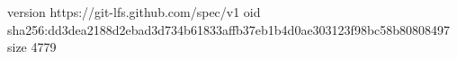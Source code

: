 version https://git-lfs.github.com/spec/v1
oid sha256:dd3dea2188d2ebad3d734b61833affb37eb1b4d0ae303123f98bc58b80808497
size 4779
